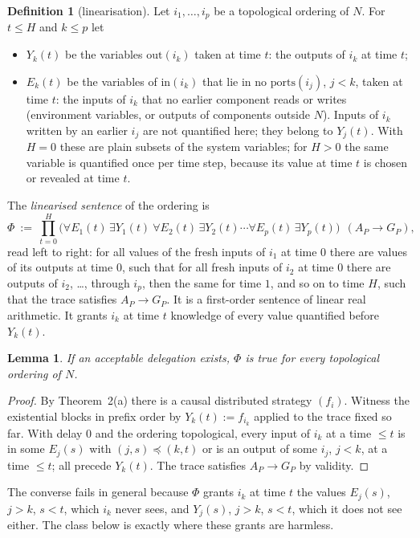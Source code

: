 \documentclass[10pt]{article}
\theoremstyle{plain}\newtheorem{theorem}{Theorem}\newtheorem{lemma}{Lemma}\newtheorem{proposition}{Proposition}
\theoremstyle{definition}\newtheorem{definition}{Definition}\newtheorem{remark}{Remark}
\newcommand{\ports}{\mathrm{ports}}\newcommand{\inp}{\mathrm{in}}\newcommand{\outp}{\mathrm{out}}\newcommand{\priv}{\mathrm{priv}}\newcommand{\edge}{\mathrm{edge}}
\begin{document}
\begin{definition}[linearisation]
Let $i_1,\dots,i_p$ be a topological ordering of $N$. For $t\le H$ and $k\le p$ let
\begin{itemize}
\item $Y_k(t)$ be the variables $\outp(i_k)$ taken at time $t$: the outputs of $i_k$ at time $t$;
\item $E_k(t)$ be the variables of $\inp(i_k)$ that lie in no $\ports(i_j)$, $j<k$, taken at time $t$: the inputs of $i_k$ that no earlier component reads or writes (environment variables, or outputs of components outside $N$). Inputs of $i_k$ written by an earlier $i_j$ are not quantified here; they belong to $Y_j(t)$. With $H=0$ these are plain subsets of the system variables; for $H>0$ the same variable is quantified once per time step, because its value at time $t$ is chosen or revealed at time $t$.
\end{itemize}
The \emph{linearised sentence} of the ordering is
\[
\Phi\ :=\ \prod_{t=0}^{H}\big(\forall E_1(t)\,\exists Y_1(t)\ \forall E_2(t)\,\exists Y_2(t)\cdots\forall E_p(t)\,\exists Y_p(t)\big)\ \ (A_P\to G_P),
\]
read left to right: for all values of the fresh inputs of $i_1$ at time $0$ there are values of its outputs at time $0$, such that for all fresh inputs of $i_2$ at time $0$ there are outputs of $i_2$, \dots, through $i_p$, then the same for time $1$, and so on to time $H$, such that the trace satisfies $A_P\to G_P$. It is a first-order sentence of linear real arithmetic. It grants $i_k$ at time $t$ knowledge of every value quantified before $Y_k(t)$.
\end{definition}
\begin{lemma}\label{lem:lin}
If an acceptable delegation exists, $\Phi$ is true for every topological ordering of $N$.
\end{lemma}
\begin{proof}
By Theorem~2(a) there is a causal distributed strategy $(f_i)$. Witness the existential blocks in prefix order by $Y_k(t):=f_{i_k}$ applied to the trace fixed so far. With delay $0$ and the ordering topological, every input of $i_k$ at a time $\le t$ is in some $E_j(s)$ with $(j,s)\preceq(k,t)$ or is an output of some $i_j$, $j<k$, at a time $\le t$; all precede $Y_k(t)$. The trace satisfies $A_P\to G_P$ by validity.
\end{proof}
The converse fails in general because $\Phi$ grants $i_k$ at time $t$ the values $E_j(s)$, $j>k$, $s<t$, which $i_k$ never sees, and $Y_j(s)$, $j>k$, $s<t$, which it does not see either. The class below is exactly where these grants are harmless.
\end{document}
